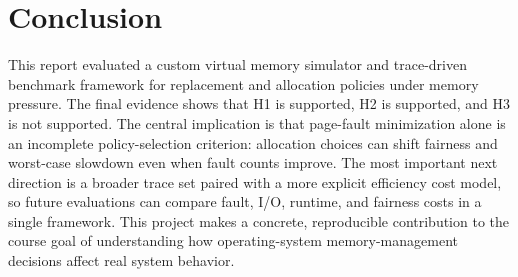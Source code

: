 \documentclass[conference]{IEEEtran}
\begin{document}
\section{Conclusion}
This report evaluated a custom virtual memory simulator and trace-driven benchmark framework for replacement and allocation policies under memory pressure. The final evidence shows that H1 is supported, H2 is supported, and H3 is not supported. The central implication is that page-fault minimization alone is an incomplete policy-selection criterion: allocation choices can shift fairness and worst-case slowdown even when fault counts improve. The most important next direction is a broader trace set paired with a more explicit efficiency cost model, so future evaluations can compare fault, I/O, runtime, and fairness costs in a single framework. This project makes a concrete, reproducible contribution to the course goal of understanding how operating-system memory-management decisions affect real system behavior.
\end{document}
